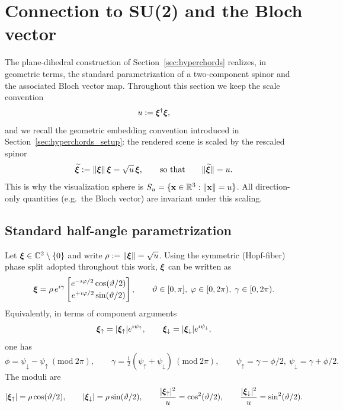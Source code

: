 \section{\label{sec:su2_viz} Connection to SU(2) and the Bloch vector}

The plane-dihedral construction of Section~\ref{sec:hyperchords} realizes, in geometric terms, the standard parametrization of a two-component spinor and the associated Bloch vector map.
Throughout this section we keep the scale convention
\[
u := \bm{\xi}^\dagger\bm{\xi},
\]
and we recall the geometric embedding convention introduced in Section~\ref{sec:hyperchords_setup}:
the rendered scene is scaled by the rescaled spinor
\[
\widetilde{\bm{\xi}}:=\|\bm{\xi}\|\,\bm{\xi}=\sqrt{u}\,\bm{\xi},
\qquad\text{so that}\qquad
\|\widetilde{\bm{\xi}}\|=u.
\]
This is why the visualization sphere is $S_u=\{\mathbf{x}\in\mathbb{R}^3:\|\mathbf{x}\|=u\}$.
All direction-only quantities (e.g.\ the Bloch vector) are invariant under this scaling.


\subsection{Standard half-angle parametrization}
\label{sec:standard_param}

Let $\bm{\xi}\in\mathbb{C}^2\setminus\{0\}$ and write $\rho:=\|\bm{\xi}\|=\sqrt{u}$.
Using the symmetric (Hopf-fiber) phase split adopted throughout this work, $\bm{\xi}$ can be written as
\begin{equation}
\label{eq:spinor_symmetric_halfangle}
\bm{\xi}
=
\rho\,e^{\imath\gamma}
\begin{bmatrix}
e^{-\imath\varphi/2}\cos(\vartheta/2)\\[2pt]
e^{+\imath\varphi/2}\sin(\vartheta/2)
\end{bmatrix},
\qquad
\vartheta\in[0,\pi],\;\varphi\in[0,2\pi),\;\gamma\in[0,2\pi).
\end{equation}
Equivalently, in terms of component arguments
\[
\bm{\xi}_\uparrow=|\bm{\xi}_\uparrow|e^{\imath\psi_\uparrow},\qquad
\bm{\xi}_\downarrow=|\bm{\xi}_\downarrow|e^{\imath\psi_\downarrow},
\]
one has
\begin{equation}
\label{eq:phase_split_defs_secIV}
\phi=\psi_\downarrow-\psi_\uparrow\ (\mathrm{mod}\ 2\pi),
\qquad
\gamma=\tfrac12(\psi_\uparrow+\psi_\downarrow)\ (\mathrm{mod}\ 2\pi),
\qquad
\psi_\uparrow=\gamma-\phi/2,\ \psi_\downarrow=\gamma+\phi/2.
\end{equation}
The moduli are
\[
|\bm{\xi}_\uparrow|=\rho\cos(\vartheta/2),
\qquad
|\bm{\xi}_\downarrow|=\rho\sin(\vartheta/2),
\qquad
\frac{|\bm{\xi}_\uparrow|^2}{u}=\cos^2(\vartheta/2),
\qquad
\frac{|\bm{\xi}_\downarrow|^2}{u}=\sin^2(\vartheta/2).
\]


